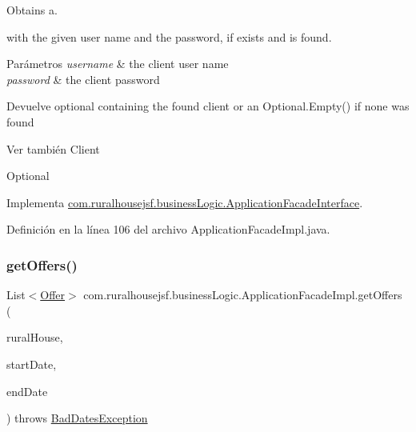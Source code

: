 Obtains a. 


\begin{DoxyCode}{0}
\end{DoxyCode}
 with the given user name and the password, if exists and is found.


\begin{DoxyParams}{Parámetros}
{\em username} & the client user name \\
\hline
{\em password} & the client password\\
\hline
\end{DoxyParams}
\begin{DoxyReturn}{Devuelve}
optional containing the found client or an {\ttfamily Optional.\+Empty()} if none was found
\end{DoxyReturn}
\begin{DoxySeeAlso}{Ver también}
Client 

Optional 
\end{DoxySeeAlso}


Implementa \mbox{\hyperlink{interfacecom_1_1ruralhousejsf_1_1business_logic_1_1_application_facade_interface_af9901ddc9cbe77aaa08085c3c19167c6}{com.\+ruralhousejsf.\+business\+Logic.\+Application\+Facade\+Interface}}.



Definición en la línea 106 del archivo Application\+Facade\+Impl.\+java.

\mbox{\label{classcom_1_1ruralhousejsf_1_1business_logic_1_1_application_facade_impl_a131acc04c80b3860f98d713d3a8ea5a5}} 
\subsubsection{\texorpdfstring{getOffers()}{getOffers()}\hspace{0.1cm}{\footnotesize\ttfamily [1/2]}}
{\footnotesize\ttfamily List$<$\mbox{\hyperlink{classcom_1_1ruralhousejsf_1_1domain_1_1_offer}{Offer}}$>$ com.\+ruralhousejsf.\+business\+Logic.\+Application\+Facade\+Impl.\+get\+Offers (\begin{DoxyParamCaption}\item[{\mbox{\hyperlink{classcom_1_1ruralhousejsf_1_1domain_1_1_rural_house}{Rural\+House}}}]{rural\+House,  }\item[{Local\+Date}]{start\+Date,  }\item[{Local\+Date}]{end\+Date }\end{DoxyParamCaption}) throws \mbox{\hyperlink{classcom_1_1ruralhousejsf_1_1exceptions_1_1_bad_dates_exception}{Bad\+Dates\+Exception}}}



